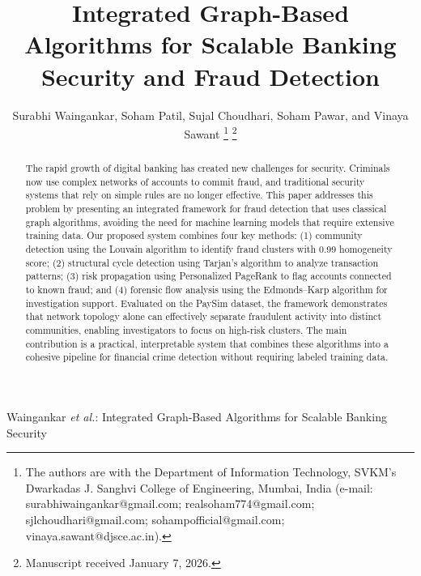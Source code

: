 \documentclass[lettersize,journal]{IEEEtran}
\begin{document}
\title{Integrated Graph-Based Algorithms for Scalable Banking Security and Fraud Detection}

\author{Surabhi Waingankar, Soham Patil, Sujal Choudhari, Soham Pawar, and Vinaya Sawant
\thanks{The authors are with the Department of Information Technology, SVKM's Dwarkadas J. Sanghvi College of Engineering, Mumbai, India (e-mail: surabhiwaingankar@gmail.com; realsoham774@gmail.com; sjlchoudhari@gmail.com; sohampofficial@gmail.com; vinaya.sawant@djsce.ac.in).}%
\thanks{Manuscript received January 7, 2026.}}

%
{Waingankar \MakeLowercase{\textit{et al.}}: Integrated Graph-Based Algorithms for Scalable Banking Security}

\maketitle

\begin{abstract}
The rapid growth of digital banking has created new challenges for security. Criminals now use complex networks of accounts to commit fraud, and traditional security systems that rely on simple rules are no longer effective. This paper addresses this problem by presenting an integrated framework for fraud detection that uses classical graph algorithms, avoiding the need for machine learning models that require extensive training data. Our proposed system combines four key methods: (1) community detection using the Louvain algorithm to identify fraud clusters with 0.99 homogeneity score; (2) structural cycle detection using Tarjan's algorithm to analyze transaction patterns; (3) risk propagation using Personalized PageRank to flag accounts connected to known fraud; and (4) forensic flow analysis using the Edmonds--Karp algorithm for investigation support. Evaluated on the PaySim dataset, the framework demonstrates that network topology alone can effectively separate fraudulent activity into distinct communities, enabling investigators to focus on high-risk clusters. The main contribution is a practical, interpretable system that combines these algorithms into a cohesive pipeline for financial crime detection without requiring labeled training data.
\end{abstract}
\end{document}
